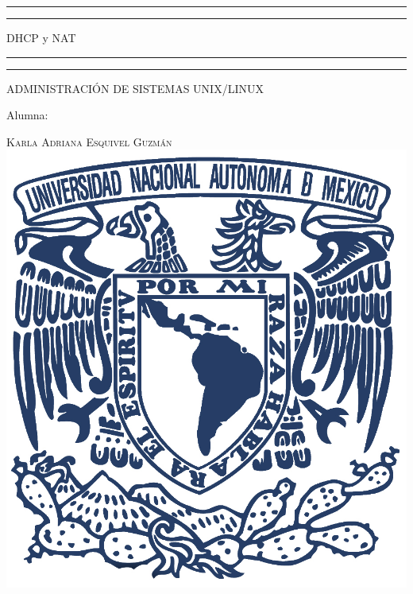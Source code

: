 \documentclass[a4paper, 11pt, oneside]{article}
\begin{document}
 

\begin{titlepage} 

	\centering 
	
	\scshape 
	
	\vspace*{\baselineskip} 
	
	
	
	\rule{\textwidth}{1.6pt}\vspace*{-\baselineskip}\vspace*{2pt} 
	\rule{\textwidth}{0.4pt} 
	
	\vspace{0.75\baselineskip} 
	
	{\LARGE DHCP y NAT}	
	\vspace{0.75\baselineskip} 
	
	\rule{\textwidth}{0.4pt}\vspace*{-\baselineskip}\vspace{3.2pt}
	\rule{\textwidth}{1.6pt} 
	
	\vspace{2\baselineskip} 
	

	ADMINISTRACIÓN DE SISTEMAS UNIX/LINUX
	
	\vspace*{3\baselineskip} 
	
	
	
	Alumna:
	
	\vspace{0.5\baselineskip} 
	
	{\scshape\Large Karla Adriana Esquivel Guzmán \\} 
	\vspace{0.5\baselineskip} 
	\vfill
	\includegraphics{unam.jpg}
	

\end{titlepage}
\end{document}
